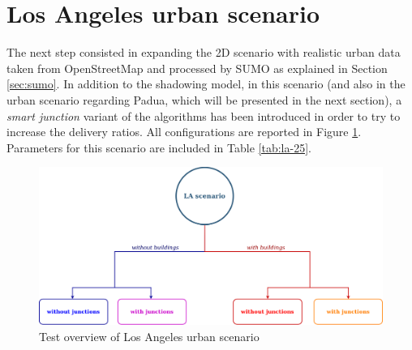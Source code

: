 
	\section{Los Angeles urban scenario}
		The next step consisted in expanding the 2D scenario with realistic urban data taken from OpenStreetMap and processed by SUMO as explained in Section \ref{sec:sumo}. In addition to the shadowing model, in this scenario (and also in the urban scenario regarding Padua, which will be presented in the next section), a \textit{smart junction} variant of the algorithms has been introduced in order to try to increase the delivery ratios. All configurations are reported in Figure \ref{fig:la-overview}. Parameters for this scenario are included in Table \ref{tab:la-25}.  
		
		\begin{figure}[H]
			\centering
			\includegraphics[width=1.0\textwidth]{immagini/la-25/overview}
			\caption{Test overview of Los Angeles urban scenario}
			\label{fig:la-overview}
		\end{figure}
	
